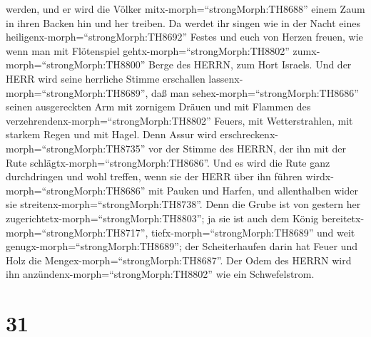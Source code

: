 werden, und er wird die Völker mitx-morph=``strongMorph:TH8688'' einem
Zaum in ihren Backen hin und her treiben.  Da werdet ihr
singen wie in der Nacht eines heiligenx-morph=``strongMorph:TH8692''
Festes und euch von Herzen freuen, wie wenn man mit Flötenspiel
gehtx-morph=``strongMorph:TH8802'' zumx-morph=``strongMorph:TH8800''
Berge des HERRN, zum Hort Israels.  Und der HERR wird seine
herrliche Stimme erschallen lassenx-morph=``strongMorph:TH8689'', daß
man sehex-morph=``strongMorph:TH8686'' seinen ausgereckten Arm mit
zornigem Dräuen und mit Flammen des
verzehrendenx-morph=``strongMorph:TH8802'' Feuers, mit Wetterstrahlen,
mit starkem Regen und mit Hagel.  Denn Assur wird
erschreckenx-morph=``strongMorph:TH8735'' vor der Stimme des HERRN, der
ihn mit der Rute schlägtx-morph=``strongMorph:TH8686''. 
Und es wird die Rute ganz durchdringen und wohl treffen, wenn sie der
HERR über ihn führen wirdx-morph=``strongMorph:TH8686'' mit Pauken und
Harfen, und allenthalben wider sie
streitenx-morph=``strongMorph:TH8738''.  Denn die Grube ist
von gestern her zugerichtetx-morph=``strongMorph:TH8803''; ja sie ist
auch dem König bereitetx-morph=``strongMorph:TH8717'',
tiefx-morph=``strongMorph:TH8689'' und weit
genugx-morph=``strongMorph:TH8689''; der Scheiterhaufen darin hat Feuer
und Holz die Mengex-morph=``strongMorph:TH8687''. Der Odem des HERRN
wird ihn anzündenx-morph=``strongMorph:TH8802'' wie ein Schwefelstrom.

\hypertarget{section-30}{%
\section{31}\label{section-30}}

